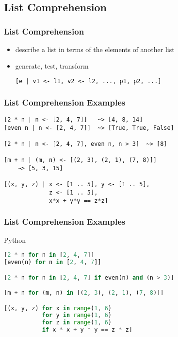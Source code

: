 \documentclass[dvipsnames]{beamer}
\theoremstyle{plain}
\begin{document}
\subsection{List Comprehension}

\begin{frame}[fragile]
  \frametitle{List Comprehension}

  \begin{itemize}
    \item describe a list in terms of the elements of another list
    \item generate, test, transform

    \medskip
    \begin{lstlisting}
[e | v1 <- l1, v2 <- l2, ..., p1, p2, ...]
    \end{lstlisting}
  \end{itemize}
\end{frame}

\begin{frame}[fragile]
  \frametitle{List Comprehension Examples}

  \begin{exampleblock}{}
    \begin{lstlisting}
[2 * n | n <- [2, 4, 7]]   ~> [4, 8, 14]
[even n | n <- [2, 4, 7]]  ~> [True, True, False]

[2 * n | n <- [2, 4, 7], even n, n > 3]  ~> [8]

[m + n | (m, n) <- [(2, 3), (2, 1), (7, 8)]]
    ~> [5, 3, 15]

[(x, y, z) | x <- [1 .. 5], y <- [1 .. 5],
             z <- [1 .. 5],
             x*x + y*y == z*z]
    \end{lstlisting}
  \end{exampleblock}
\end{frame}

\begin{frame}[fragile]
  \frametitle{List Comprehension Examples}

  \begin{exampleblock}{Python}
    \begin{lstlisting}[language=Python]
[2 * n for n in [2, 4, 7]]
[even(n) for n in [2, 4, 7]]

[2 * n for n in [2, 4, 7] if even(n) and (n > 3)]

[m + n for (m, n) in [(2, 3), (2, 1), (7, 8)]]

[(x, y, z) for x in range(1, 6)
           for y in range(1, 6)
           for z in range(1, 6)
           if x * x + y * y == z * z]
    \end{lstlisting}
  \end{exampleblock}
\end{frame}
\end{document}
